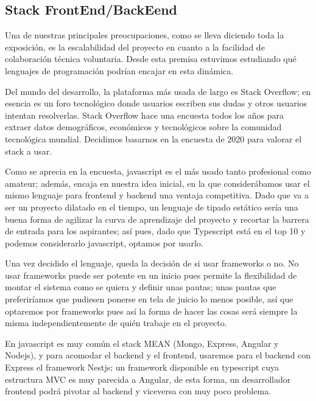 \subsection{Stack FrontEnd/BackEend}
Una de nuestras principales preocupaciones, como se lleva diciendo toda la exposición, es la escalabilidad del proyecto en cuanto a la facilidad de colaboración técnica voluntaria. Desde esta premisa estuvimos estudiando qué lenguajes de programación podrían encajar en esta dinámica.
\vspace{1em}
\par Del mundo del desarrollo, la plataforma más usada de largo es Stack Overflow; en esencia es un foro tecnológico donde usuarios escriben sus dudas y otros usuarios intentan resolverlas. Stack Overflow hace una encuesta todos los años para extraer datos demográficos, económicos y tecnológicos sobre la comunidad tecnológica mundial. Decidimos basarnos en la encuesta de 2020 \citep{techSurveyStackOverflow} para valorar el stack a usar.
\vspace{1em}
\par Como se aprecia en la encuesta, javascript es el más usado tanto profesional como amateur; además, encaja en nuestra idea inicial, en la que considerábamos usar el mismo lenguaje para frontend y backend una ventaja competitiva. Dado que va a ser un proyecto dilatado en el tiempo, un lenguaje de tipado estático sería una buena forma de agilizar la curva de aprendizaje del proyecto y recortar la barrera de entrada para los aspirantes; así pues, dado que Typescript está en el top 10 y podemos considerarlo javascript, optamos por usarlo.
\vspace{1em}
\par Una vez decidido el lenguaje, queda la decisión de si usar frameworks o no. No usar frameworks puede ser potente en un inicio pues permite la flexibilidad de montar el sistema como se quiera y definir unas pautas; unas pautas que preferiríamos que pudiesen ponerse en tela de juicio lo menos posible, así que optaremos por frameworks pues así la forma de hacer las cosas será siempre la misma independientemente de quién trabaje en el proyecto.
\vspace{1em}
\par En javascript es muy común el stack MEAN (Mongo, Express, Angular y Nodejs), y para acomodar el backend y el frontend, usaremos para el backend con Express el framework Nestjs; un framework disponible en typescript cuya estructura MVC es muy parecida a Angular, de esta forma, un desarrollador frontend podrá pivotar al backend y viceversa con muy poco problema.
